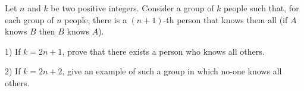 Let $n$ and $k$ be two positive integers. Consider a group of $k$ people such that, for each group of $n$ people, there is a $(n+1)$-th person that knows them all (if $A$ knows $B$ then $B$ knows $A$).

1) If $k=2n+1$,  prove that there exists a person who knows all others.

2)  If $k=2n+2$,  give an example of such a group in which no-one knows all others.